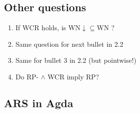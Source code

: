 \documentclass{scrartcl}
\begin{document}
\subsection{Other questions}
\begin{enumerate}
  \item If WCR holds, is WN$\downarrow\subseteq$WN ?
  \item Same question for next bullet in 2.2
  \item Same for bullet 3 in 2.2 (but pointwise!)
  \item Do RP- $\land$ WCR imply RP?
\end{enumerate}
\subsection{ARS in Agda}
\end{document}

